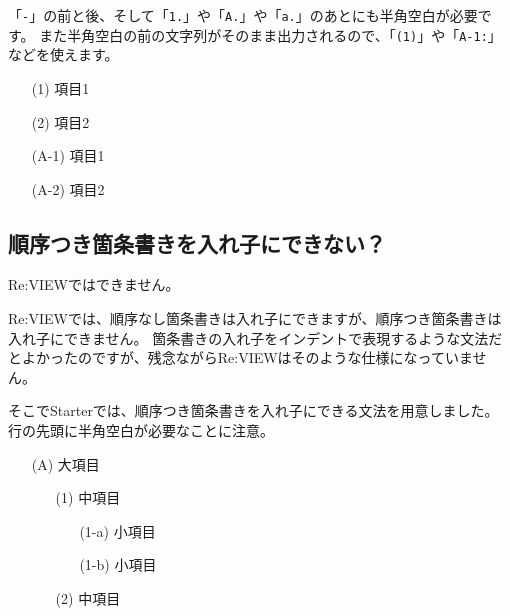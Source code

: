 「\texttt{{-}}」の前と後、そして「\texttt{1.}」や「\texttt{A.}」や「\texttt{a.}」のあとにも半角空白が必要です。
また半角空白の前の文字列がそのまま出力されるので、「\texttt{(1)}」や「\texttt{A{-}1:}」などを使えます。

\begin{starterprogram}\end{starterprogram}
\noindent
{}

\starterresult

\begin{enumerate}
\item[(1)] 項目1
\item[(2)] 項目2
\end{enumerate}

\begin{enumerate}
\item[(A{-}1)] 項目1
\item[(A{-}2)] 項目2
\end{enumerate}

\endstarterresult

\subsection{順序つき箇条書きを入れ子にできない？}
\label{sec:2-2-3}

Re:VIEWではできません。

Re:VIEWでは、順序なし箇条書きは入れ子にできますが、順序つき箇条書きは入れ子にできません。
箇条書きの入れ子をインデントで表現するような文法だとよかったのですが、残念ながらRe:VIEWはそのような仕様になっていません。

そこでStarterでは、順序つき箇条書きを入れ子にできる文法を用意しました。
行の先頭に半角空白が必要なことに注意。

\begin{starterprogram}\end{starterprogram}
\noindent
{}

\starterresult

\begin{enumerate}
\item[(A)] 大項目

\begin{enumerate}
\item[(1)] 中項目

\begin{enumerate}
\item[(1{-}a)] 小項目
\item[(1{-}b)] 小項目
\end{enumerate}

\item[(2)] 中項目
\end{enumerate}

\end{enumerate}

